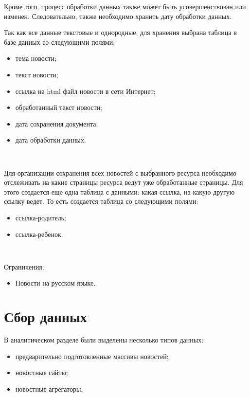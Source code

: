 Кроме того, процесс обработки данных также может быть усовершенствован или изменен. Следовательно, также необходимо хранить дату обработки данных.

Так как все данные текстовые и однородные, для хранения выбрана таблица в базе данных со следующими полями: 

\begin{itemize}
    \item тема новости;
    \item текст новости; 
    \item ссылка на html файл новости в сети Интернет;
    \item обработанный текст новости;
    \item дата сохранения документа;
    \item дата обработки данных.
\end{itemize}

~\

Для организации сохранения всех новостей с выбранного ресурса необходимо отслеживать на какие страницы ресурса ведут уже обработанные страницы. Для этого создается еще одна таблица с данными: какая ссылка, на какую другую ссылку ведет. То есть создается таблица со следующими полями: 

\begin{itemize}
    \item ссылка-родитель;
    \item ссылка-ребенок.
\end{itemize}

~\

Ограничения:

\begin{itemize}
    \item Новости на русском языке.
\end{itemize}

%
\section{Сбор данных}


В аналитическом разделе были выделены несколько типов данных: 

\begin{itemize}
    \item предварительно подготовленные массивы новостей; 
    \item новостные сайты;
    \item новостные агрегаторы.
\end{itemize}

